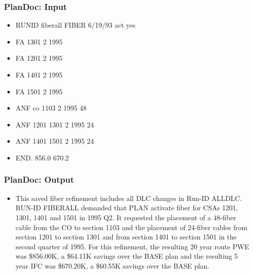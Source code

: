 \documentclass[compress,color=usenames]{beamer}
\begin{document}
\begin{frame}
\frametitle{PlanDoc: Input}

\label{f24}
\begin{itemize}
\item { {RUNID fiberall FIBER 6/19/93 act yes}}
\item { {FA 1301 2 1995}}
\item { {FA 1201 2 1995}}
\item { {FA 1401 2 1995}}
\item { {FA 1501 2 1995}}
\item { {ANF co 1103 2 1995 48}}
\item { {ANF 1201 1301 2 1995 24}}
\item { {ANF 1401 1501 2 1995 24}}
\item { {END. 856.0 670.2}}
\end{itemize}

\end{frame}

\begin{frame}
\frametitle{PlanDoc: Output}

\label{f26}
\begin{itemize}
\item { {This saved fiber refinement includes all DLC changes in Run-ID ALLDLC. RUN-ID FIBERALL demanded that PLAN activate fiber for CSAs 1201, 1301, 1401 and 1501 in 1995 Q2. It requested the placement of a 48-fiber cable from the CO to section 1103 and the placement of 24-fiber cables from section 1201 to section 1301 and from section 1401 to section 1501 in the second quarter of 1995. For this refinement, the resulting 20 year route PWE was \$856.00K, a \$64.11K savings over the BASE plan and the resulting 5 year IFC was \$670.20K, a \$60.55K savings over the BASE plan.}}
\end{itemize}

\end{frame}
\end{document}
